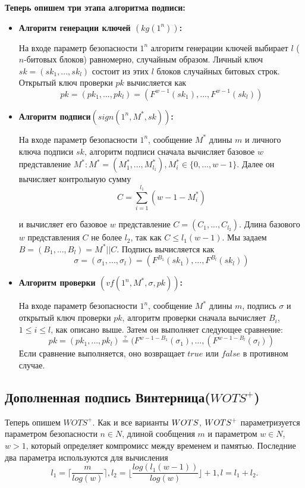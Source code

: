 \documentclass[a4paper, 14pt]{extarticle}
\begin{document}
\textbf{Теперь опишем три этапа алгоритма подписи:}

\begin{itemize}
    \item \textbf{Алгоритм генерации ключей $(kg(1^{n}))$:}
    
    На входе параметр безопасности $1^{n}$ алгоритм генерации ключей выбирает $l$ ($n$-битовых блоков) равномерно, случайным образом. Личный ключ $sk = (sk_{1}, ..., sk_{l})$ состоит из этих $l$ блоков случайных битовых строк. Открытый ключ проверки $pk$ вычисляется как
    \[ pk = (pk_{1}, ..., pk_{l}) = (F^{w - 1}(sk_{1}), ..., F^{w - 1}(sk_{l})) \]

    \item \textbf{Алгоритм подписи$(sign(1^{n}, M^{*}, sk))$:}

    На входе параметр безопасности $1^{n}$, сообщение $M^{*}$ длины $m$ и личного ключа подписи $sk$, алгоритм подписи сначала вычисляет базовое $w$ представление $M^{*}: M^{*} = (M^{*}_{1}, ..., M^{*}_{l_{1}}), M^{*}_{i} \in \{0, ..., w - 1\}$. Далее он вычисляет контрольную сумму
    \[ C = \sum^{l_{1}}_{i = 1}(w - 1 - M^{*}_{i}) \]

    и вычисляет его базовое $w$ представление $C = (C_{1}, ..., C_{l_2})$. Длина базового $w$ представления $C$ не более $l_{2}$, так как $C \leq l_{1}(w - 1)$. Мы задаем $B = (B_{1}, ..., B_{l}) = M^{*} || C$. Подпись вычисляется как
    \[ \sigma = (\sigma_{1}, ..., \sigma_{l}) = (F^{B_1}(sk_{1}), ..., F^{B_l}(sk_{l})) \]

    \item \textbf{Алгоритм проверки $(vf(1^{n}, M^{*}, \sigma, pk))$:}

    На входе параметр безопасности $1^{n}$, сообщение $M^{*}$ длины $m$, подпись $\sigma$ и открытый ключ проверки $pk$, алгоритм проверки сначала вычисляет $B_{i}$, $ 1 \leq i \leq l$, как описано выше. Затем он выполняет следующее сравнение:
    \[ pk = (pk_{1}, ..., pk_{l}) \stackrel{?}= (F^{w - 1 - B_{1}}(\sigma_{1}), ..., (F^{w - 1 - B_{l}}(\sigma_{l})) \]
    Если сравнение выполняется, оно возвращает $true$ или $false$ в противном случае.
\end{itemize}

\subsection{Дополненная подпись Винтерница($WOTS^{+}$)}
Теперь опишем $WOTS^{+}$. Как и все варианты $W\-OTS$, $W\-OTS^{+}$ параметризуется параметром безопасности $n \in N$, длиной сообщения $m$ и параметром $w \in N$, $w > 1$, который определяет компромисс между временем и памятью. Последние два параметра используются для вычисления
\[ l_{1} = \Bigg \lceil \frac{m}{log(w)} \Bigg \rceil, l_{2} = \Bigg \lfloor \frac{log(l_{1}(w - 1))}{log(w)} \Bigg \rfloor + 1, l = l_{1} + l_{2}. \]
\end{document}

